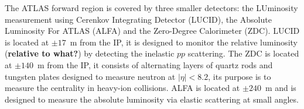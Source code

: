The ATLAS forward region is covered by three smaller detectors: the LUminosity
measurement using Cerenkov Integrating Detector (LUCID), the Absolute Luminosity
For ATLAS (ALFA) and the Zero-Degree Calorimeter (ZDC). LUCID is located at
$\pm 17$~m from the IP, it is designed to monitor the relative luminosity
(\textbf{relative to what?}) by detecting the inelastic $pp$ scattering. The ZDC
is located at $\pm 140$~m from the IP, it consists of alternating layers of
quartz rods and tungsten plates designed to measure neutron at $|\eta| < 8.2$,
its purpose is to measure the centrality in heavy-ion collisions. ALFA is
located at $\pm 240$~m and is designed to measure the absolute luminosity via
elastic scattering at small angles.
